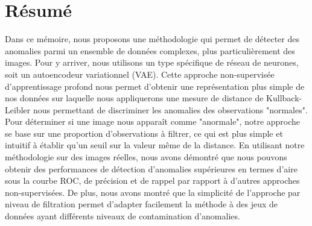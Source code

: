 \chapter*{Résumé}             %
\label{chap:resume}           %


Dans ce mémoire, nous proposons une méthodologie qui permet de détecter des anomalies parmi un ensemble de données complexes, plus particulièrement des images. Pour y arriver, nous utilisons un type spécifique de réseau de neurones, soit un autoencodeur variationnel (VAE). Cette approche non-supervisée d'apprentissage profond nous permet d'obtenir une représentation plus simple de nos données sur laquelle nous appliquerons une mesure de distance de Kullback-Leibler nous permettant de discriminer les anomalies des observations "normales". Pour déterminer si une image nous apparaît comme "anormale", notre approche se base sur une proportion d'observations à filtrer, ce qui est plus simple et intuitif à établir qu'un seuil sur la valeur même de la distance. En utilisant notre méthodologie sur des images réelles, nous avons démontré que nous pouvons obtenir des performances de détection d'anomalies supérieures en termes d'aire sous la courbe ROC, de précision et de rappel par rapport à d'autres approches non-supervisées. De plus, nous avons montré que la simplicité de l'approche par niveau de filtration permet d'adapter facilement la méthode à des jeux de données ayant différents niveaux de contamination d'anomalies.
